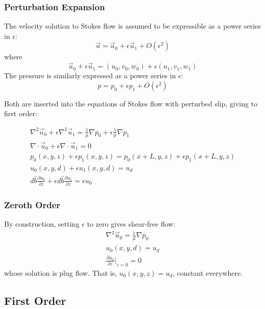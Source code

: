 \documentclass[a4paper]{report}
\begin{document}
\subsubsection*{Perturbation Expansion}

The velocity solution to Stokes flow is assumed to be expressible as a power series in $\epsilon$:
\begin{equation}
\vec{u} = \vec{u}_0 + \epsilon \vec{u}_1 + O(\epsilon^2)
\end{equation}
where
\begin{equation}
\vec{u}_0 + \epsilon \vec{u}_1 = (u_0, v_0, w_0) + \epsilon(u_1, v_1, w_1)
\end{equation}
The pressure is similarly expressed as a power series in $\epsilon$:
\begin{equation}
p = p_0 + \epsilon p_1 + O(\epsilon^2)
\end{equation}

Both are inserted into the equations of Stokes flow with perturbed slip, giving to first order:

\begin{gather}
\nabla^2 \vec{u}_0 + \epsilon \nabla^2 \vec{u}_1 =
 \frac{1}{\mu} \nabla p_0 + \epsilon \frac{1}{\mu} \nabla p_1 \\
\nabla \cdot \vec{u}_0 + \epsilon \nabla \cdot \vec{u}_1 = 0  \\
p_0(x,y,z) + \epsilon p_1(x,y,z) = p_0(x+L,y,z) + \epsilon p_1(x+L,y,z) \\
u_0(x,y,d) + \epsilon u_1(x,y,d) = u_d \\ 
 d \hat{b} \frac{\partial u_0}{\partial z}  +
  \epsilon  d \hat{b} \frac{\partial u_1}{\partial z}
= \epsilon u_0
\end{gather}


\subsubsection*{Zeroth Order}

By construction, setting $\epsilon$ to zero gives shear-free flow:
\begin{gather}
\nabla^2 \vec{u}_0  = \frac{1}{\mu} \nabla p_0 \\
u_0(x,y,d) = u_d \\ 
\frac{\partial u_0}{\partial z} \rvert_{z=0} = 0
\end{gather}
whose solution is plug flow.  That is, $u_0(x,y,z) = u_d$, constant everywhere.

\subsection*{First Order}
\end{document}
